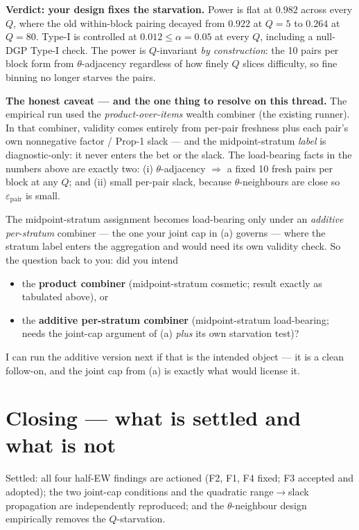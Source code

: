 \documentclass[11pt,a4paper]{article}
\begin{document}
\noindent\textbf{Verdict: your design fixes the starvation.} Power is flat at
$0.982$ across every $Q$, where the old within-block pairing decayed from $0.922$
at $Q = 5$ to $0.264$ at $Q = 80$. Type-I is controlled at $0.012 \le \alpha =
0.05$ at every $Q$, including a null-DGP Type-I check. The power is $Q$-invariant
\emph{by construction}: the 10 pairs per block form from $\theta$-adjacency
regardless of how finely $Q$ slices difficulty, so fine binning no longer starves
the pairs.

\medskip
\noindent\textbf{The honest caveat --- and the one thing to resolve on this
thread.} The empirical run used the \emph{product-over-items} wealth combiner
(the existing runner). In that combiner, validity comes entirely from
per-pair freshness plus each pair's own nonnegative factor / Prop-1 slack ---
and the midpoint-stratum \emph{label} is diagnostic-only: it never enters the bet
or the slack. The load-bearing facts in the numbers above are exactly two:
(i) $\theta$-adjacency $\Rightarrow$ a fixed 10 fresh pairs per block at any $Q$;
and (ii) small per-pair slack, because $\theta$-neighbours are close so
$\varepsilon_{\mathrm{pair}}$ is small.

The midpoint-stratum assignment becomes load-bearing only under an
\emph{additive per-stratum} combiner --- the one your joint cap in (a) governs
--- where the stratum label enters the aggregation and would need its own
validity check. So the question back to you: did you intend
\begin{itemize}
\item the \textbf{product combiner} (midpoint-stratum cosmetic; result exactly as
  tabulated above), or
\item the \textbf{additive per-stratum combiner} (midpoint-stratum load-bearing;
  needs the joint-cap argument of (a) \emph{plus} its own starvation test)?
\end{itemize}
I can run the additive version next if that is the intended object --- it is a
clean follow-on, and the joint cap from (a) is exactly what would license it.

\section*{Closing --- what is settled and what is not}

\noindent Settled: all four half-EW findings are actioned (F2, F1, F4 fixed; F3
accepted and adopted); the two joint-cap conditions and the quadratic
range$\to$slack propagation are independently reproduced; and the
$\theta$-neighbour design empirically removes the $Q$-starvation.
\end{document}
